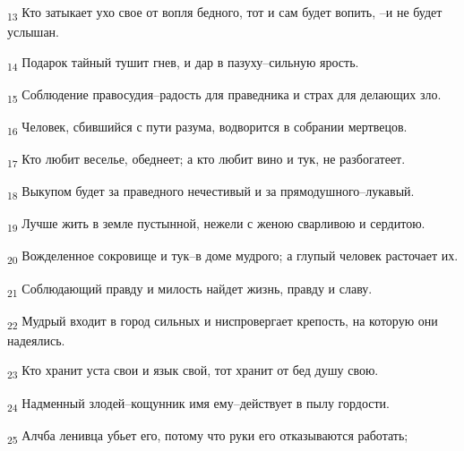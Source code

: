 \begin{tcolorbox}
\textsubscript{13} Кто затыкает ухо свое от вопля бедного, тот и сам будет вопить, --и не будет услышан.
\end{tcolorbox}
\begin{tcolorbox}
\textsubscript{14} Подарок тайный тушит гнев, и дар в пазуху--сильную ярость.
\end{tcolorbox}
\begin{tcolorbox}
\textsubscript{15} Соблюдение правосудия--радость для праведника и страх для делающих зло.
\end{tcolorbox}
\begin{tcolorbox}
\textsubscript{16} Человек, сбившийся с пути разума, водворится в собрании мертвецов.
\end{tcolorbox}
\begin{tcolorbox}
\textsubscript{17} Кто любит веселье, обеднеет; а кто любит вино и тук, не разбогатеет.
\end{tcolorbox}
\begin{tcolorbox}
\textsubscript{18} Выкупом будет за праведного нечестивый и за прямодушного--лукавый.
\end{tcolorbox}
\begin{tcolorbox}
\textsubscript{19} Лучше жить в земле пустынной, нежели с женою сварливою и сердитою.
\end{tcolorbox}
\begin{tcolorbox}
\textsubscript{20} Вожделенное сокровище и тук--в доме мудрого; а глупый человек расточает их.
\end{tcolorbox}
\begin{tcolorbox}
\textsubscript{21} Соблюдающий правду и милость найдет жизнь, правду и славу.
\end{tcolorbox}
\begin{tcolorbox}
\textsubscript{22} Мудрый входит в город сильных и ниспровергает крепость, на которую они надеялись.
\end{tcolorbox}
\begin{tcolorbox}
\textsubscript{23} Кто хранит уста свои и язык свой, тот хранит от бед душу свою.
\end{tcolorbox}
\begin{tcolorbox}
\textsubscript{24} Надменный злодей--кощунник имя ему--действует в пылу гордости.
\end{tcolorbox}
\begin{tcolorbox}
\textsubscript{25} Алчба ленивца убьет его, потому что руки его отказываются работать;
\end{tcolorbox}
